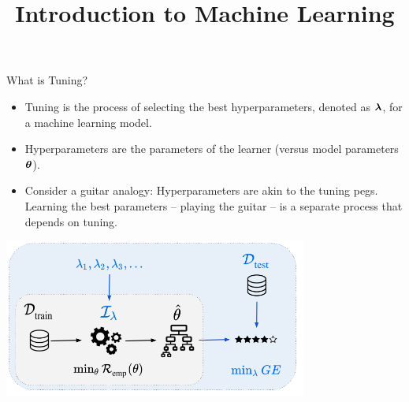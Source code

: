 \documentclass[11pt,compress,t,notes=noshow, xcolor=table]{beamer}
\title{Introduction to Machine Learning}
\begin{document}

\begin{vbframe}{What is Tuning?}
\begin{itemize}
\item \small Tuning is the process of selecting the best hyperparameters, denoted as $\bm{\lambda}$, for a machine learning model.
\item \small Hyperparameters are the parameters of the learner (versus model parameters $\bm{\theta}$).
\item \small Consider a guitar analogy: Hyperparameters are akin to the tuning pegs. Learning the best parameters \bm{$\thetabh$} -- playing the guitar -- is a separate process that depends on tuning.
\end{itemize}

\begin{center}
\includegraphics[width = 0.75\textwidth]{figure_man/riskmin_bilevel3.png}
\end{center}

\end{vbframe}
\end{document}
